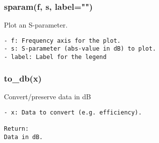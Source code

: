 \subsubsection{sparam(f, s, label="")}
Plot an S-parameter.

\begin{verbatim}
- f: Frequency axis for the plot.
- s: S-parameter (abs-value in dB) to plot.
- label: Label for the legend
\end{verbatim}

\subsubsection{to\_db(x)}
Convert/preserve data in dB

\begin{verbatim}
- x: Data to convert (e.g. efficiency).

Return:
Data in dB.
\end{verbatim}

